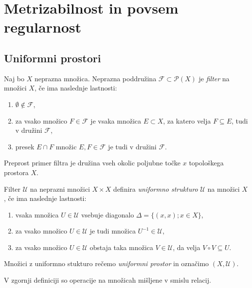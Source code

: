 \documentclass[mat1]{fmfdelo}
\newcommand{\Ucurl}{\mathcal{U}}
\begin{document}
\section{Metrizabilnost in povsem regularnost}

\subsection{Uniformni prostori}

\begin{definicija}\label{def:uniform}
Naj bo $X$ neprazna množica. Neprazna poddružina $\mathcal{F} \subset \mathcal{P}(X)$ je \emph{filter} na množici $X$, če ima naslednje lastnosti:
\begin{enumerate}
\item $\emptyset \notin \mathcal{F}$,
\item za vsako množico $F \in \mathcal{F}$ je vsaka množica $E \subset X$, za katero velja $F \subseteq E$, tudi v družini $\mathcal{F}$,
\item presek $E \cap F$ množic $E, F \in \mathcal{F}$ je tudi v družini $\mathcal{F}$.
\end{enumerate}
\end{definicija}

\begin{primer}
Preprost primer filtra je družina vseh okolic poljubne točke $x$ topološkega prostora $X$. 
\end{primer}
\begin{definicija}
Filter $\mathcal{U}$ na neprazni množici $X \times X$ definira \emph{uniformno strukturo} $\Ucurl$ na množici $X$, če ima naslednje lastnosti:
\begin{enumerate}
\item vsaka množica $U \in \mathcal{U}$ vsebuje diagonalo $\Delta = \lbrace (x, x) ; x \in X \rbrace$,
\item za vsako množico $U \in \mathcal{U}$ je tudi množica $U^{-1} \in \mathcal{U}$,
\item za vsako množico $U \in \mathcal{U}$ obstaja taka množica $V \in \mathcal{U}$, da velja $V \circ V \subseteq U$.
\end{enumerate}
Množici z uniformno stukturo rečemo \emph{uniformni prostor} in označimo $(X, \Ucurl)$.
\end{definicija}

\begin{opomba}
	V zgornji definiciji so operacije na množicah mišljene v smislu relacij.
\end{opomba}
\end{document}
